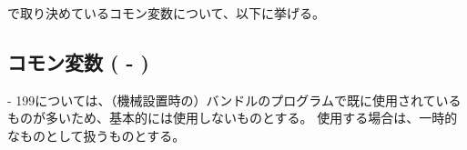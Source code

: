 
\DMname で取り決めているコモン変数について、以下に挙げる。






\subsection{コモン変数 ( - )}
 - \pcrNum199については、（機械設置時の）バンドルのプログラムで既に使用されているものが多いため、基本的には使用しないものとする。
使用する場合は、一時的なものとして扱うものとする。



